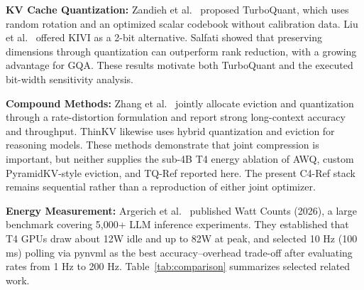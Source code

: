 \documentclass[conference]{IEEEtran}
\begin{document}
\textbf{KV Cache Quantization:} Zandieh et al.\ \cite{zandieh_turboquant_2025} proposed TurboQuant, which uses random rotation and an optimized scalar codebook without calibration data. Liu et al.\ \cite{liu_kivi_2023} offered KIVI as a 2-bit alternative. Salfati \cite{salfati_quantization_2026} showed that preserving dimensions through quantization can outperform rank reduction, with a growing advantage for GQA. These results motivate both TurboQuant and the executed bit-width sensitivity analysis.

\textbf{Compound Methods:} Zhang et al.\ \cite{zhang_rdkv_2026} jointly allocate eviction and quantization through a rate-distortion formulation and report strong long-context accuracy and throughput. ThinKV \cite{ramachandran_thinkv_2026} likewise uses hybrid quantization and eviction for reasoning models. These methods demonstrate that joint compression is important, but neither supplies the sub-4B T4 energy ablation of AWQ, custom PyramidKV-style eviction, and TQ-Ref reported here. The present C4-Ref stack remains sequential rather than a reproduction of either joint optimizer.

\textbf{Energy Measurement:} Argerich et al.\ \cite{argerich_watt_2026} published Watt Counts (2026), a large benchmark covering 5,000+ LLM inference experiments. They established that T4 GPUs draw about 12W idle and up to 82W at peak, and selected 10 Hz (100 ms) polling via pynvml as the best accuracy--overhead trade-off after evaluating rates from 1 Hz to 200 Hz. Table~\ref{tab:comparison} summarizes selected related work.
\end{document}
